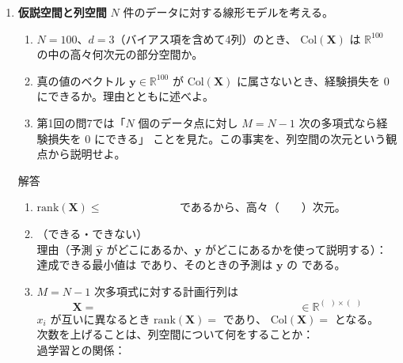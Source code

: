 \documentclass[a4paper,dvipdfmx]{jsarticle}
\newcommand{\提出期限}{2026年10月12日（月）}
\newcommand{\学籍番号}{0000000}
\newcommand{\氏名}{氏名を書く}
\newcommand{\提出日}{2026年10月12日}
\newenvironment{answer}{\begin{itembox}[l]{解答}}{\end{itembox}}
\begin{document}
\begin{enumerate}
  \item \textbf{仮説空間と列空間}\quad
    $N$ 件のデータに対する線形モデルを考える。
    \begin{enumerate}
      \item $N = 100$、$d = 3$（バイアス項を含めて4列）のとき、
        $\mathrm{Col}(\bm{X})$ は $\mathbb{R}^{100}$ の中の高々何次元の部分空間か。
      \item 真の値のベクトル $\bm{y} \in \mathbb{R}^{100}$ が
        $\mathrm{Col}(\bm{X})$ に属さないとき、経験損失を $0$ にできるか。理由とともに述べよ。
      \item 第1回の問7では「$N$ 個のデータ点に対し $M = N-1$ 次の多項式なら経験損失を $0$ にできる」
        ことを見た。この事実を、列空間の次元という観点から説明せよ。
    \end{enumerate}
    \begin{answer}
      \begin{enumerate}
        \item $\mathrm{rank}(\bm{X}) \leq \phantom{XXXXXXXX}$ であるから、高々（　　）次元。
        \item （できる・できない）\\
          理由（予測 $\hat{\bm{y}}$ がどこにあるか、$\bm{y}$ がどこにあるかを使って説明する）：\\[8mm]
          達成できる最小値は \phantom{XXXXXXXXXXXXXXXX} であり、そのときの予測は
          $\bm{y}$ の \phantom{XXXXXXXX} である。
        \item $M = N-1$ 次多項式に対する計画行列は
          \begin{equation*}
            \bm{X} = \phantom{XXXXXXXXXXXXXXXXXXXXXX} \in \mathbb{R}^{(\ \ ) \times (\ \ )}
          \end{equation*}
          $x_i$ が互いに異なるとき $\mathrm{rank}(\bm{X}) = $ \phantom{XX} であり、
          $\mathrm{Col}(\bm{X}) = $ \phantom{XXXXXX} となる。\\[1mm]
          次数を上げることは、列空間について何をすることか：\\[6mm]
          過学習との関係：
      \end{enumerate}
    \end{answer}


\end{enumerate}
\end{document}

